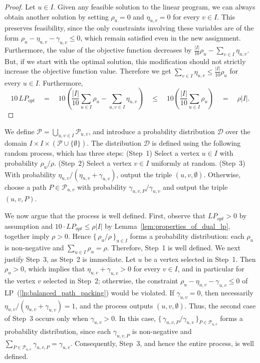 \documentclass[11pt]{amsart}
\newcommand{\lpopt}{LP_{opt}}
\begin{document}
\begin{proof}
    Let $u\in I$. Given any feasible solution to the linear program, we can always obtain another solution by setting $\rho_{u} = 0$ and $\eta_{u,v} = 0$ for every $v\in I$. This preserves feasibility, since the only constraints involving these variables are of the form $\rho_{u} - \eta_{u,v} - \gamma_{u,v} \leq 0$, which remain satisfied even in the new assignment. Furthermore, the value of the objective function decreases by $\frac{|I|}{10}\rho_{u} - \sum_{v\in I}\eta_{u,v}$. But, if we start with the optimal solution, this modification should not strictly increase the objective function value. Therefore we get $\sum_{v\in I}\eta_{u,v} \leq \frac{|I|}{10}\rho_{u}$ for every $u\in I$. Furthermore,
    $$
    10\,\lpopt \quad
    = \quad 10\left(\frac{|I|}{10} \sum_{u \in I} \rho_u - \sum_{u,v \in I} \eta_{u,v}\right) \quad
    \leq \quad 10\left(\frac{|I|}{10} \sum_{u \in I} \rho_u\right) \quad
    = \quad \rho|I|.
    $$
\end{proof}
    
We define $\mathcal{P} = \bigcup_{u,v \in I} \mathcal{P}_{u,v}$, and introduce a probability distribution $\mathcal{D}$ over the domain $I\times I\times (\mathcal{P} \cup \{\emptyset\})$. The distribution $\mathcal{D}$ is defined using the following random process, which has three steps: (Step~1) Select a vertex $u \in I$ with probability $\rho_u / \rho$. (Step~2) Select a vertex $v \in I$ uniformly at random.  (Step~3) With probability $\eta_{u,v} / (\eta_{u,v} + \gamma_{u,v})$, output the triple $(u, v, \emptyset)$. Otherwise, choose a path $P \in \mathcal{P}_{u,v}$ with probability $\gamma_{u,v,P} / \gamma_{u,v}$ and output the triple $(u, v, P)$. 

We now argue that the process is well defined.
% 
First, observe that $\lpopt > 0$ by assumption and $10\cdot\lpopt \leq \rho |I|$ by Lemma~\ref{lem:properties_of_dual_lp}, together imply $\rho > 0$. Hence $\{\, \rho_u / \rho \,\}_{u \in I}$ forms a probability distribution: each $\rho_u$ is non-negative and $\sum_{u \in I} \rho_u = \rho$. Therefore, Step~1 is well defined.
% 
We next justify Step~3, as Step~2 is immediate.
% 
Let $u$ be a vertex selected in Step~1. Then $\rho_u > 0$, which implies that $\eta_{u,v} + \gamma_{u,v} > 0$ for every $v \in I$, and in particular for the vertex $v$ selected in Step~2; otherwise, the constraint $\rho_u - \eta_{u,v} - \gamma_{u,v} \leq 0$ of LP~(\ref{lp:balanced_path_packing}) would be violated. If $\gamma_{u,v} = 0$, then necessarily $\eta_{u,v} / (\eta_{u,v} + \gamma_{u,v}) = 1$, and the process outputs $(u,v,\emptyset)$. Thus, the second case of Step~3 occurs only when $\gamma_{u,v} > 0$. In this case, $\{\, \gamma_{u,v,P} / \gamma_{u,v} \,\}_{P \in \mathcal{P}_{u,v}}$ forms a probability distribution, since each $\gamma_{u,v,P}$ is non-negative and $\sum_{P \in \mathcal{P}_{u,v}} \gamma_{u,v,P} = \gamma_{u,v}$.
% 
Consequently, Step~3, and hence the entire process, is well defined.
\end{document}
